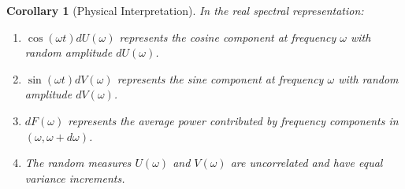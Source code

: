 \documentclass{article}
\newtheorem{corollary}{Corollary}
{\theorembodyfont{\rmfamily}\newtheorem{remark}{Remark}}
\begin{document}
\begin{corollary}[Physical Interpretation]
  In the real spectral representation:
  \begin{enumerate}
    \item $\cos (\omega t) dU (\omega)$ represents the cosine component at
    frequency $\omega$ with random amplitude $dU (\omega)$.
    
    \item $\sin (\omega t) dV (\omega)$ represents the sine component at
    frequency $\omega$ with random amplitude $dV (\omega)$.
    
    \item $dF (\omega)$ represents the average power contributed by frequency
    components in $(\omega, \omega + d \omega)$.
    
    \item The random measures $U (\omega)$ and $V (\omega)$ are uncorrelated
    and have equal variance increments.
  \end{enumerate}
\end{corollary}
\end{document}
